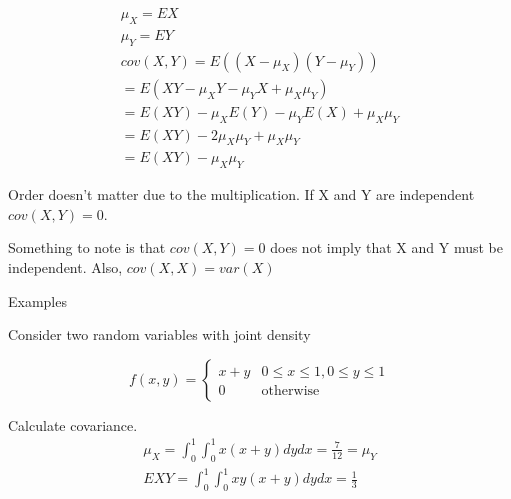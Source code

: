 \documentclass{report}
\begin{document}
\begin{description}
\begin{mdframed}
            \begin{gather}
                \mu_X = EX\\
                \mu_Y = EY\\ 
                cov(X, Y) = E((X - \mu_X)(Y - \mu_Y))\\
                = E(XY - \mu_XY - \mu_YX + \mu_X \mu_Y)\\
                = E(XY) - \mu_XE(Y) - \mu_YE(X) + \mu_X \mu_Y\\
                = E(XY) - 2 \mu_X \mu_Y + \mu_X \mu_Y\\
                = E(XY) - \mu_X \mu_Y
            \end{gather}
            
            Order doesn't matter due to the multiplication.
            If X and Y are independent $cov(X, Y) = 0$.

            \vspace{10}

            Something to note is that $cov(X,Y) = 0$ does not
            imply that X and Y must be independent. Also,
             $cov(X, X) = var(X)$
        \end{mdframed}
    \item {\large Examples} 
        \begin{mdframed}
            Consider two random variables with joint density

            \begin{displaymath}
                f(x,y) = 
                \begin{cases}
                    x + y & 0 \le x \le 1, 0 \le y \le 1\\ 
                    0 & \textrm{otherwise}
                \end{cases}
            \end{displaymath}

            Calculate covariance.
            \begin{gather}
               \mu_X = \int_0^1 \int_0^1 x(x+y) dy dx =  
               \frac{7}{12} = \mu_Y\\
               EXY = \int_0^1 \int_0^1 xy(x + y)dydx = \frac{1}{3}
            \end{gather}


\end{mdframed}
\end{description}
\end{document}
